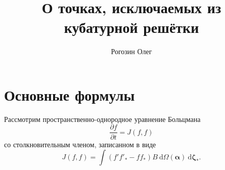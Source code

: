 \documentclass[a4paper,12pt]{article}
\title{О точках, исключаемых из кубатурной решётки}
\author{Рогозин Олег}
\newcommand{\dd}{\:\mathrm{d}}
\newcommand{\pder}[2][]{\frac{\partial#1}{\partial#2}}
\newcommand{\dzeta}{\boldsymbol{\dd\zeta}}
\begin{document}
\maketitle
\tableofcontents

\section{Основные формулы}

Рассмотрим пространственно-однородное уравнение Больцмана
\begin{equation}\label{eq:Boltzmann}
    \pder[f]{t} = J(f,f)
\end{equation}
со столкновительным членом, записанном в виде
\begin{equation}\label{eq:ci}
    J(f,f) = \int (f'f'_*-ff_*)B\dd\Omega(\boldsymbol\alpha)\dzeta_*.
\end{equation}
\end{document}
